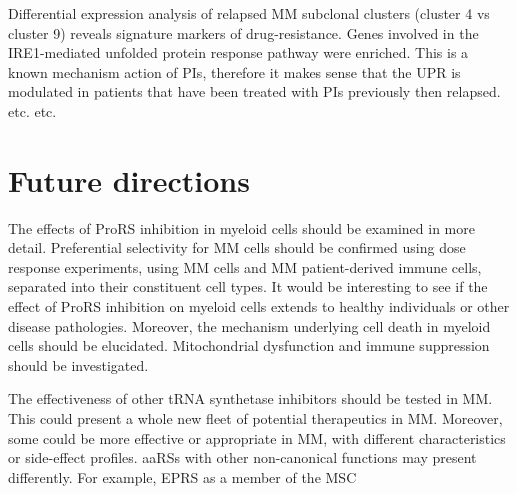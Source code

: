 Differential expression analysis of relapsed MM subclonal clusters (cluster 4 vs cluster 9) reveals signature markers of drug-resistance.
Genes involved in the IRE1-mediated unfolded protein response pathway were enriched.
This is a known mechanism action of PIs, therefore it makes sense that the UPR is modulated in patients that have been treated with PIs previously then relapsed. etc. etc.


%
%
%
%

\section{Future directions}
The effects of ProRS inhibition in myeloid cells should be examined in more detail.
Preferential selectivity for MM cells should be confirmed using dose response experiments, using MM cells and MM patient-derived immune cells, separated into their constituent cell types. %
It would be interesting to see if the effect of ProRS inhibition on myeloid cells extends to healthy individuals or other disease pathologies.
Moreover, the mechanism underlying cell death in myeloid cells should be elucidated.
Mitochondrial dysfunction and immune suppression should be investigated.

The effectiveness of other tRNA synthetase inhibitors should be tested in MM\@.
This could present a whole new fleet of potential therapeutics in MM\@.
Moreover, some could be more effective or appropriate in MM, with different characteristics or side-effect profiles.
aaRSs with other non-canonical functions may present differently.
For example, EPRS as a member of the MSC

